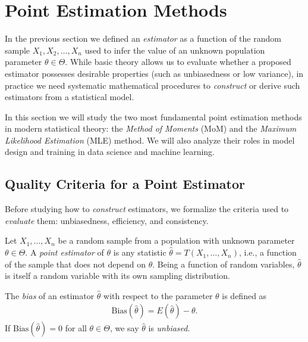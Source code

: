 \section{Point Estimation Methods}

In the previous section we defined an \emph{estimator} as a function of the random sample $X_1, X_2, \ldots, X_n$ used to infer the value of an unknown population parameter $\theta \in \Theta$. While basic theory allows us to evaluate whether a proposed estimator possesses desirable properties (such as unbiasedness or low variance), in practice we need systematic mathematical procedures to \emph{construct} or derive such estimators from a statistical model.

In this section we will study the two most fundamental point estimation methods in modern statistical theory: the \emph{Method of Moments} (MoM) and the \emph{Maximum Likelihood Estimation} (MLE) method. We will also analyze their roles in model design and training in data science and machine learning.

\subsection{Quality Criteria for a Point Estimator}

Before studying how to \emph{construct} estimators, we formalize the criteria used to \emph{evaluate} them: unbiasedness, efficiency, and consistency.

\begin{definicion}
Let $X_1, \ldots, X_n$ be a random sample from a population with unknown parameter $\theta \in \Theta$. A \emph{point estimator} of $\theta$ is any statistic $\hat{\theta} = T(X_1, \ldots, X_n)$, i.e., a function of the sample that does not depend on $\theta$. Being a function of random variables, $\hat{\theta}$ is itself a random variable with its own sampling distribution.
\end{definicion}

\begin{definicion}[Bias]
 \label{eq:6.1.1}
The \emph{bias} of an estimator $\hat{\theta}$ with respect to the parameter $\theta$ is defined as
\begin{align}
 \text{Bias}(\hat{\theta}) = E(\hat{\theta}) - \theta.
\end{align}
If $\text{Bias}(\hat{\theta}) = 0$ for all $\theta \in \Theta$, we say $\hat{\theta}$ is \emph{unbiased}.
\end{definicion}

